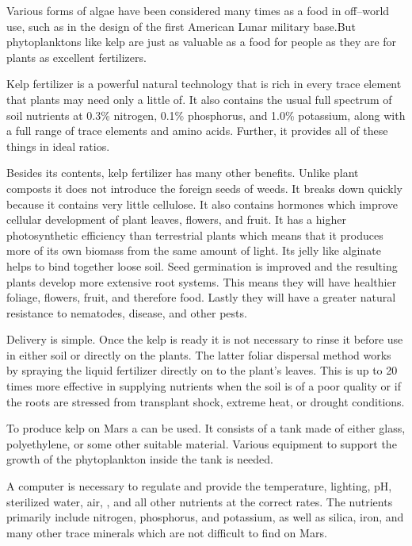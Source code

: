 Various forms of algae have been considered many times as a food in off--world use, such as in the design of the first American Lunar military base. But phytoplanktons like kelp are just as valuable as a food for people as they are for plants as excellent fertilizers.

Kelp fertilizer is a powerful natural technology that is rich in every trace element that plants may need only a little of. It also contains the usual full spectrum of soil nutrients at 0.3\% nitrogen, 0.1\% phosphorus, and 1.0\% potassium, along with a full range of trace elements and amino acids. Further, it provides all of these things in ideal ratios.

Besides its contents, kelp fertilizer has many other benefits. Unlike plant composts it does not introduce the foreign seeds of weeds. It breaks down quickly because it contains very little cellulose. It also contains hormones which improve cellular development of plant leaves, flowers, and fruit. It has a higher photosynthetic efficiency than terrestrial plants which means that it produces more of its own biomass from the same amount of light. Its jelly like alginate helps to bind together loose soil. Seed germination is improved and the resulting plants develop more extensive root systems. This means they will have healthier foliage, flowers, fruit, and therefore food. Lastly they will have a greater natural resistance to nematodes, disease, and other pests.

Delivery is simple. Once the kelp is ready it is not necessary to rinse it before use in either soil or directly on the plants. The latter foliar dispersal method works by spraying the liquid fertilizer directly on to the plant's leaves. This is up to 20 times more effective in supplying nutrients when the soil is of a poor quality or if the roots are stressed from transplant shock, extreme heat, or drought conditions.

To produce kelp on Mars a  can be used. It consists of a tank made of either glass, polyethylene, or some other suitable material. Various equipment to support the growth of the phytoplankton inside the tank is needed.

A computer is necessary to regulate and provide the temperature, lighting, pH, sterilized water, air, , and all other nutrients at the correct rates. The nutrients primarily include nitrogen, phosphorus, and potassium, as well as silica, iron, and many other trace minerals which are not difficult to find on Mars. 

